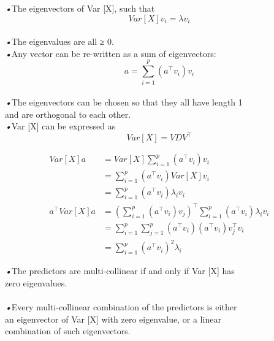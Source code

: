 \documentclass{beamer}
\begin{document}
	\begin{frame}
	\emph{•}The eigenvectors of Var [X], such that
	\begin{equation*}
		Var\left[ X\right] v_i=\lambda v_i
	\end{equation*}
	\\\emph{•}The eigenvalues are all ≥ 0.
	\\\emph{•}Any vector can be re-written as a sum of eigenvectors:
	\begin{equation*}
		a=\sum_{i=1}^{p}\left( a^\intercal v_i\right) v_i
	\end{equation*}
	\\\emph{•}The eigenvectors can be chosen so that they all have length 1
	\\\quad and are orthogonal to each other.
	\\\emph{•}Var [X] can be expressed as 
	\begin{equation*}
		Var\left[ X\right] = VDV^\intercal
	\end{equation*}
\end{frame}

	\begin{frame}
		\begin{equation*}
		\begin{aligned}
		Var\left[ X\right] a &= Var\left[ X\right]\sum_{i=1}^{p}\left( a^\intercal v_i\right) v_i
		\\&=\sum_{i=1}^{p}\left( a^\intercal v_i\right)Var\left[ X\right]v_i
		\\&=\sum_{i=1}^{p}\left( a^\intercal v_i\right)\lambda_i v_i
		\\a^\intercal Var\left[ X\right]a  
		&= \left( \sum_{i=1}^{p}\left( a^\intercal v_i\right)v_j\right) ^\intercal \sum_{i=1}^{p}\left( a^\intercal v_i\right)\lambda_i v_i
		\\&=\sum_{i=1}^{p}\sum_{j=1}^{p}\left( a^\intercal v_i\right)\left( a^\intercal v_i\right)v_j^\intercal v_i
		\\&=\sum_{i=1}^{p}\left( a^\intercal v_i\right)^2\lambda_i
		\end{aligned}
		\end{equation*}
	\end{frame}

	\begin{frame}
	\emph{•}The predictors are multi-collinear if and only if Var [X] has  
	\\\quad zero eigenvalues.
	\\\mbox{}
	\\\emph{•}Every multi-collinear combination of the predictors is either 
	\\\quad an  eigenvector of Var [X] with zero eigenvalue, or a linear 
	\\\quad combination of such eigenvectors.
    \end{frame}
	
	
\end{document}
